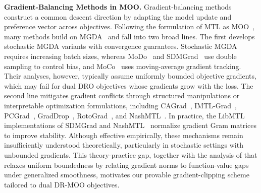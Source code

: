 \documentclass[twoside]{article} %
\theoremstyle{plain}
\theoremstyle{definition}
\theoremstyle{remark}
\begin{document}
\textbf{Gradient-Balancing Methods in MOO.}
Gradient-balancing methods construct a common descent direction by adapting the model update and preference vector across objectives. Following the formulation of MTL as MOO~\citep{1stempiricalMGDAwork}, many methods build on MGDA~\citep{MGDA1stwork} and fall into two broad lines. The first develops stochastic MGDA variants with convergence guarantees. Stochastic MGDA~\citep{stochasticMGDA} requires increasing batch sizes, whereas MoDo~\citep{MODO} and SDMGrad~\citep{SDMkaiyiJi} use double sampling to control bias, and MoCo~\citep{MOCO} uses moving-average gradient tracking. Their analyses, however, typically assume uniformly bounded objective gradients, which may fail for dual DRO objectives whose gradients grow with the loss. The second line mitigates gradient conflicts through structured manipulations or interpretable optimization formulations, including CAGrad~\citep{CAGrad}, IMTL-Grad~\citep{IMTLGrad}, PCGrad~\citep{PCGrad}, GradDrop~\citep{GradDrop}, RotoGrad~\citep{Rotograd}, and NashMTL~\citep{nashMTL}. In practice, the LibMTL implementations of SDMGrad and NashMTL~\citep{LibMTL} normalize gradient Gram matrices to improve stability. Although effective empirically, these mechanisms remain insufficiently understood theoretically, particularly in stochastic settings with unbounded gradients. This theory-practice gap, together with the analysis of \citet{qimgda} that relaxes uniform boundedness by relating gradient norms to function-value gaps under generalized smoothness, motivates our provable gradient-clipping scheme tailored to dual DR-MOO objectives.


\end{document}
